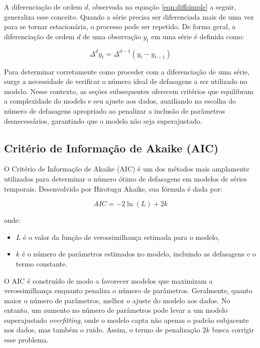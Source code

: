 \documentclass[12pt,oneside,a4paper,chapter=TITLE,english,brazil,sumario=abnt-6027-2012]{abntex2}
\begin{document}
A diferenciação de ordem \( d \), observada na equação \ref{eqn:diffsimple} a seguir, generaliza esse conceito. Quando a série precisa ser diferenciada mais de uma vez para se tornar estacionária, o processo pode ser repetido. De forma geral, a diferenciação de ordem \( d \) de uma observação \( y_t \) em uma série é definida como:

\begin{equation}
	\label{eqn:diffsimple}
	\Delta^d y_t = \Delta^{d-1}(y_t - y_{t-1})
\end{equation}

Para determinar corretamente como proceder com a diferenciação de uma série, surge a necessidade de verificar o número ideal de defasagens a ser utilizado no modelo. Nesse contexto, as seções subsequentes oferecem critérios que equilibram a complexidade do modelo e seu ajuste aos dados, auxiliando na escolha do número de defasagens apropriado ao penalizar a inclusão de parâmetros desnecessários, garantindo que o modelo não seja superajustado.

\subsection{Critério de Informação de Akaike (AIC)}

O Critério de Informação de Akaike (AIC) é um dos métodos mais amplamente utilizados para determinar o número ótimo de defasagens em modelos de séries temporais. Desenvolvido por Hirotugu Akaike, sua fórmula é dada por:

\begin{equation}
	AIC = -2 \ln(L) + 2k
\end{equation}

onde:

\begin{itemize}
	\item \( L \) é o valor da função de verossimilhança estimada para o modelo,
	\item \( k \) é o número de parâmetros estimados no modelo, incluindo as defasagens e o termo constante.
\end{itemize}

O AIC é construído de modo a favorecer modelos que maximizam a verossimilhança enquanto penaliza o número de parâmetros. Geralmente, quanto maior o número de parâmetros, melhor o ajuste do modelo aos dados. No entanto, um aumento no número de parâmetros pode levar a um modelo superajustado \textit{overfitting}, onde o modelo capta não apenas o padrão subjacente nos dados, mas também o ruído. Assim, o termo de penalização \( 2k \) busca corrigir esse problema.
\end{document}
